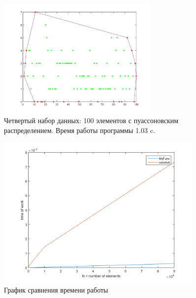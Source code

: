 \documentclass[12pt]{article}
\begin{document}
\begin {figure}[ht]
\centering
   \includegraphics[width=0.7\textwidth]{4.png}
   \caption{Четвертый  набор данных: 100 элементов с пуассоновским распределением. Время работы программы 1.03 c.}
			\label{fig:4}
\end{figure}
\begin {figure}[ht]
\centering
   \includegraphics[width=0.9\textwidth]{g1.png}
   \caption{График сравнения времени работы}
				\label{fig:5}
\end{figure}
\end{document}
